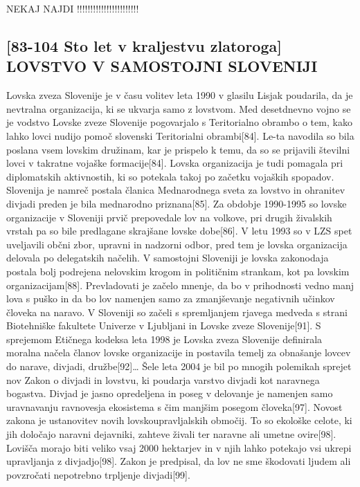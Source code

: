 \documentclass[a4paper,12pt,openright]{book}
\begin{document}
NEKAJ NAJDI !!!!!!!!!!!!!!!!!!!!!!!

\subsection{[83-104 Sto let v kraljestvu zlatoroga] LOVSTVO V SAMOSTOJNI SLOVENIJI}
Lovska zveza Slovenije je v času volitev leta 1990 v glasilu Lisjak poudarila, da je nevtralna organizacija, ki se ukvarja samo z lovstvom. 
Med desetdnevno vojno se je vodstvo Lovske zveze Slovenije pogovarjalo s Teritorialno obrambo o tem, kako lahko lovci nudijo pomoč slovenski Teritorialni obrambi[84].
Le-ta navodila so bila poslana vsem lovskim družinam, kar je prispelo k temu, da so se prijavili številni lovci v takratne vojaške formacije[84].
Lovska organizacija je tudi pomagala pri diplomatskih aktivnostih, ki so potekala takoj po začetku vojaških spopadov.
Slovenija je namreč postala članica Mednarodnega sveta za lovstvo in ohranitev divjadi preden je bila mednarodno priznana[85].
Za obdobje 1990-1995 so lovske organizacije v Sloveniji prvič prepovedale lov na volkove, pri drugih živalskih vrstah pa so bile predlagane skrajšane lovske dobe[86]. 
V letu 1993 so v LZS spet uveljavili občni zbor, upravni in nadzorni odbor, pred tem je lovska organizacija delovala po delegatskih načelih.
V samostojni Sloveniji je lovska zakonodaja postala bolj podrejena nelovskim krogom in političnim strankam, kot pa lovskim organizacijam[88]. 
Prevladovati je začelo mnenje, da bo v prihodnosti vedno manj lova s puško in da bo lov namenjen samo za zmanjševanje negativnih učinkov človeka na naravo.
V Sloveniji so začeli s spremljanjem rjavega medveda s strani Biotehniške fakultete Univerze v Ljubljani in Lovske zveze Slovenije[91]. 
S sprejemom Etičnega kodeksa leta 1998 je Lovska zveza Slovenije definirala moralna načela članov lovske organizacije in postavila temelj za obnašanje lovcev do narave, divjadi, družbe[92]… 
Šele leta 2004 je bil po mnogih polemikah sprejet nov Zakon o divjadi in lovstvu, ki poudarja varstvo divjadi kot naravnega bogastva. 
Divjad je jasno opredeljena in poseg v delovanje je namenjen samo uravnavanju ravnovesja ekosistema s čim manjšim posegom človeka[97].
Novost zakona je ustanovitev novih  lovskoupravljalskih območij. 
To so ekološke celote, ki jih določajo naravni dejavniki, zahteve živali ter naravne ali umetne ovire[98].
Lovišča morajo biti veliko vsaj 2000 hektarjev in v njih lahko potekajo vsi ukrepi upravljanja z divjadjo[98].
Zakon je predpisal, da lov ne sme škodovati ljudem ali povzročati nepotrebno trpljenje divjadi[99].
\end{document}
